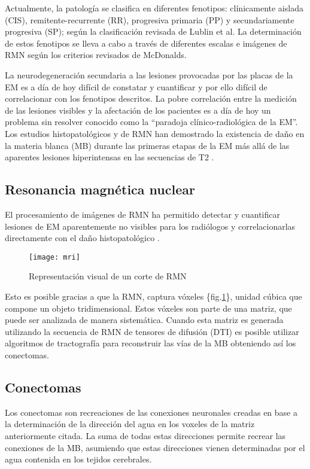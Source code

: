 \documentclass[fleqn,10pt]{UICArticle} %
\begin{document}
Actualmente, la patología se clasifica en diferentes fenotipos: clínicamente aislada (CIS), remitente-recurrente (RR), progresiva primaria (PP) y secundariamente progresiva (SP); según la clasificación revisada de Lublin et al\cite{Lublin2014}. La determinación de estos fenotipos se lleva a cabo a través de diferentes escalas e imágenes de RMN según los criterios revisados de McDonalds\cite{Polman20112}.

La neurodegeneración secundaria a las lesiones provocadas por las placas de la EM es a día de hoy difícil de constatar y cuantificar y por ello difícil de correlacionar con los fenotipos descritos. La pobre correlación entre la medición de las lesiones visibles y la afectación de los pacientes es a día de hoy un problema sin resolver conocido como la “paradoja clínico-radiológica de la EM”. Los estudios histopatológicos y de RMN han demostrado la existencia de daño en la materia blanca (MB) durante las primeras etapas de la EM más allá de las aparentes lesiones hiperintensas en las secuencias de T2 \cite{Beer2016}.

\subsection{Resonancia magnética nuclear}

El procesamiento de imágenes de RMN ha permitido detectar y cuantificar lesiones de EM aparentemente no visibles para los radiólogos y correlacionarlas directamente con el daño histopatológico \cite{Beer2016}.

\begin{figure}[ht]
	\centering
	\texttt{[image: mri]}
	\caption{Representación visual de un corte de RMN}
	\label{fig:voxeles}
\end{figure}

Esto es posible gracias a que la RMN, captura vóxeles \{fig.\ref{fig:voxeles}\}, unidad cúbica que compone un objeto tridimensional. Estos vóxeles son parte de una matriz, que puede ser analizada de manera sistemática. Cuando esta matriz es generada utilizando la secuencia de RMN de tensores de difusión (DTI) es posible utilizar algoritmos de tractografía para reconstruir las vías de la MB obteniendo así los conectomas.

\subsection{Conectomas}
Los conectomas son recreaciones de las conexiones neuronales creadas en base a la determinación de la dirección del agua en los voxeles de la matriz anteriormente citada. La suma de todas estas direcciones permite recrear las conexiones de la MB, asumiendo que estas direcciones vienen determinadas por el agua contenida en los tejidos cerebrales.
\end{document}
